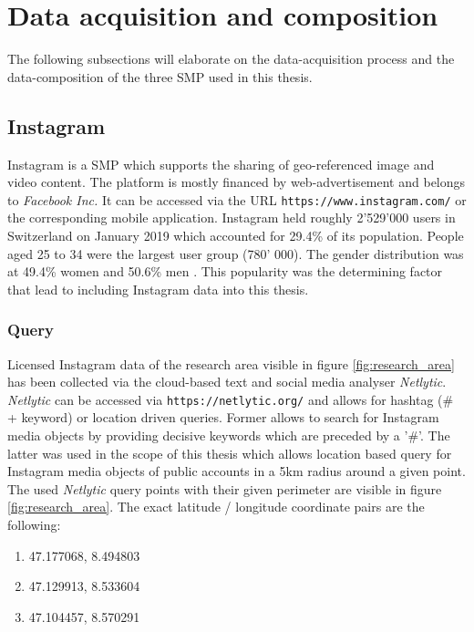 \section{Data acquisition and composition} \label{data_acquisition}
The following subsections will elaborate on the data-acquisition process and the data-composition of the three SMP used in this thesis. 

\subsection{Instagram} \label{instagram}
Instagram is a SMP which supports the sharing of geo-referenced image and video content. The platform is mostly financed by web-advertisement and belongs to \textit{Facebook Inc.} It can be accessed via the URL \texttt{https://www.instagram.com/} or the corresponding mobile application.
Instagram held roughly 2'529'000 users in Switzerland on January 2019 which accounted for 29.4\% of its population. People aged 25 to 34 were the largest user group (780' 000). The gender distribution was at 49.4\% women and 50.6\% men \parencite{2013}. This popularity was the determining factor that lead to including Instagram data into this thesis.\\

\subsubsection{Query} \label{netlytic}
Licensed Instagram data of the research area visible in figure \ref{fig:research_area} has been collected via the cloud-based text and social media analyser \textit{Netlytic}. \textit{Netlytic} can be accessed via \texttt{https://netlytic.org/} and allows for hashtag (\# + keyword) or location driven queries. Former allows to search for Instagram media objects by providing decisive keywords which are preceded by a '\#'. The latter was used in the scope of this thesis which allows location based query for Instagram media objects of public accounts in a 5km radius around a given point. The used \textit{Netlytic} query points with their given perimeter are visible in figure \ref{fig:research_area}. The exact latitude / longitude coordinate pairs are the following:\\
\begin{enumerate}
  \item 47.177068, 8.494803
  \item 47.129913, 8.533604
  \item 47.104457, 8.570291
\end{enumerate}

